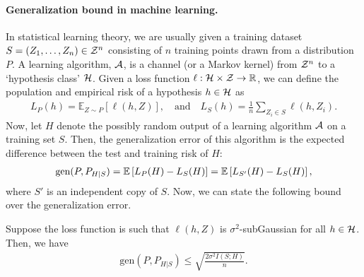             \paragraph{ Generalization bound in machine learning.}  In statistical learning theory, we are usually given a training dataset $S = (Z_1, \ldots, Z_n) \in \mathcal{Z}^n$ consisting of $n$ \iid training points drawn from a distribution $P$. A learning algorithm, $\mathcal{A}$, is a channel (or a Markov kernel) from $\mathcal{Z}^n$ to a `hypothesis class' $\mathcal{H}$. Given a loss function $\ell:\mathcal{H} \times \mathcal{Z} \to \mathbb{R}$, we can define the population and empirical risk of a hypothesis $h \in \mathcal{H}$ as 
            \begin{align}
                L_P(h) = \mathbb{E}_{Z \sim P}[\ell(h, Z)],  \quad \text{and} \quad 
                L_S(h) = \frac{1}{n} \sum_{Z_i \in S} \ell(h, Z_i). 
            \end{align}
            Now, let $H$ denote the possibly random output of a learning algorithm $\mathcal{A}$ on a training set $S$. Then, the generalization error of this algorithm is the expected difference between the test and training risk of $H$:
            \begin{align}
                \text{gen}(P, P_{H|S}) = \mathbb{E}\left[ L_P(H) - L_S(H) \right] = \mathbb{E}\left[ L_{S'}(H) - L_S(H) \right], 
            \end{align}
            where $S'$ is an independent copy of $S$. Now, we can state the following bound over the generalization error. 
            \begin{proposition}
                \label{prop:generalization-error} 
                Suppose the loss function is such that $\ell(h, Z)$ is $\sigma^2$-subGaussian for all $h \in \mathcal{H}$. Then, we have 
                \begin{align}
                    \text{gen}(P, P_{H|S}) \leq \sqrt{ \frac{2 \sigma^2 I(S; H)}{n}}. 
                \end{align}
            \end{proposition}
